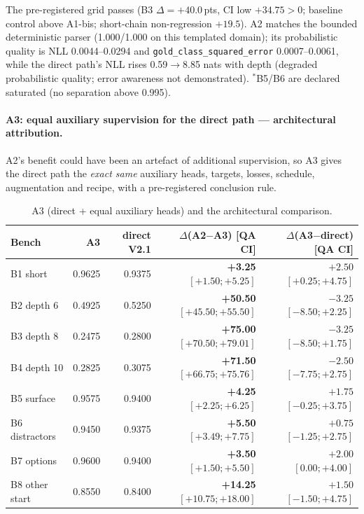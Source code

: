 \documentclass[11pt,a4paper]{article}
\newcommand{\code}[1]{\texttt{#1}}
\newcommand{\dpt}{\ensuremath{\Delta}}
\begin{document}
The pre-registered grid passes (B3 $\dpt=+40.0$\,pts, CI low $+34.75>0$; baseline control above A1-bis; short-chain non-regression $+19.5$). A2 matches the bounded deterministic parser (1.000/1.000 on this templated domain); its probabilistic quality is NLL 0.0044--0.0294 and \code{gold\_class\_squared\_error} 0.0007--0.0061, while the direct path's NLL rises 0.59$\to$8.85 nats with depth (degraded probabilistic quality; error awareness not demonstrated). $^\ast$B5/B6 are declared saturated (no separation above 0.995).

\paragraph{A3: equal auxiliary supervision for the direct path --- architectural attribution.} A2's benefit could have been an artefact of additional supervision, so A3 gives the direct path the \emph{exact same} auxiliary heads, targets, losses, schedule, augmentation and recipe, with a pre-registered conclusion rule.

\begin{table}[t]
\centering
\caption{A3 (direct + equal auxiliary heads) and the architectural comparison.}
\label{tab:a3}
\small
\begin{tabular}{lrrrr}
\toprule
Bench & A3 & direct V2.1 & $\dpt$(A2$-$A3) [QA CI] & $\dpt$(A3$-$direct) [QA CI] \\
\midrule
B1 short & 0.9625 & 0.9375 & \textbf{+3.25} $[+1.50;+5.25]$ & $+2.50$ $[+0.25;+4.75]$ \\
B2 depth 6 & 0.4925 & 0.5250 & \textbf{+50.50} $[+45.50;+55.50]$ & $-3.25$ $[-8.50;+2.25]$ \\
B3 depth 8 & 0.2475 & 0.2800 & \textbf{+75.00} $[+70.50;+79.01]$ & $-3.25$ $[-8.50;+1.75]$ \\
B4 depth 10 & 0.2825 & 0.3075 & \textbf{+71.50} $[+66.75;+75.76]$ & $-2.50$ $[-7.75;+2.75]$ \\
B5 surface & 0.9575 & 0.9400 & \textbf{+4.25} $[+2.25;+6.25]$ & $+1.75$ $[-0.25;+3.75]$ \\
B6 distractors & 0.9450 & 0.9375 & \textbf{+5.50} $[+3.49;+7.75]$ & $+0.75$ $[-1.25;+2.75]$ \\
B7 options & 0.9600 & 0.9400 & \textbf{+3.50} $[+1.50;+5.50]$ & $+2.00$ $[0.00;+4.00]$ \\
B8 other start & 0.8550 & 0.8400 & \textbf{+14.25} $[+10.75;+18.00]$ & $+1.50$ $[-1.50;+4.75]$ \\
\bottomrule
\end{tabular}
\end{table}
\end{document}

